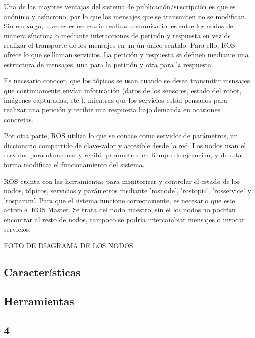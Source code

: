 Una de las mayores ventajas del sistema de publicación/suscripción es que es
anónimo y asíncrono, por lo que los mensajes que se transmiten no se modifican.
Sin embargo, a veces es necesario realizar comunicaciones entre los nodos de
manera síncrona o mediante interacciones de petición y respuesta en vez de
realizar el transporte de los mensajes en un ún único sentido. Para ello, ROS 
ofrece lo que se llaman servicios. La petición y respuesta se definen mediante
una estructura de mensajes, una para la petición y otra para la respuesta.

Es necesario conocer, que los tópicos se usan cuando se desea transmitir
mensajes que continuamente envían información (datos de los sensores, estado del
robot, imágenes capturadas, etc.), mientras que los servicios están pensados
para realizar una petición y recibir una respuesta bajo demanda en ocasiones
concretas.

Por otra parte, ROS utiliza lo que se conoce como servidor de parámetros, un
diccionario compartido de clave-valor y accesible desde la red. Los nodos usan
el servidor para almacenar y recibir parámetros en tiempo de ejecución, y de
esta forma modificar el funcionamiento del sistema.

ROS cuenta con las herramientas para monitorizar y controlar el estado de los
nodos, tópicos, servicios y parámetros mediante 'rosnode', 'rostopic',
'rosservice' y 'rosparam'. Para que el sistema funcione correctamente, es
necesario que este activo el ROS Master. Se trata del nodo maestro, sin él los
nodos no podrían encontrar al resto de nodos, tampoco se podría intercambiar
mensajes o invocar servicios.


FOTO DE DIAGRAMA DE LOS NODOS

\subsection{Características}

\subsection{Herramientas}

\subsection{4}
